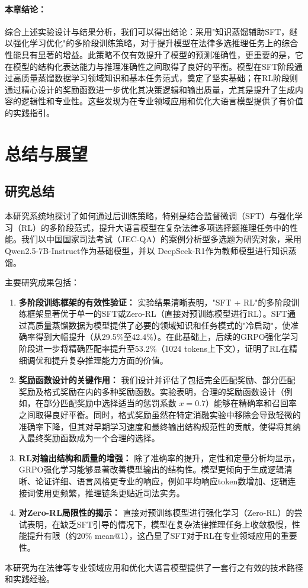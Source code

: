 \documentclass{article}
\newcommand{\qwen}{Qwen2.5-7B-Instruct}
\newcommand{\deepseekr}{DeepSeek-R1}
\newcommand{\qwen}{Qwen2.5-7B-Instruct}
\newcommand{\deepseekr}{DeepSeek-R1}
\begin{document}
\paragraph{本章结论：}
综合上述实验设计与结果分析，我们可以得出结论：采用"知识蒸馏辅助SFT，继以强化学习优化"的多阶段训练策略，对于提升模型在法律多选推理任务上的综合性能具有显著的增益。此策略不仅有效提升了模型的预测准确性，更重要的是，它在模型的结构化表达能力与推理准确性之间取得了良好的平衡。模型在SFT阶段通过高质量蒸馏数据学习领域知识和基本任务范式，奠定了坚实基础；在RL阶段则通过精心设计的奖励函数进一步优化其决策逻辑和输出质量，尤其是提升了生成内容的逻辑性和专业性。这些发现为在专业领域应用和优化大语言模型提供了有价值的实践指引。


\section{总结与展望}
\label{sec:conclusion_future_work}

\subsection{研究总结}
本研究系统地探讨了如何通过后训练策略，特别是结合监督微调（SFT）与强化学习（RL）的多阶段范式，提升大语言模型在复杂法律多项选择题推理任务中的性能。我们以中国国家司法考试（JEC-QA）的案例分析型多选题为研究对象，采用 \qwen 作为基础模型，并以 \deepseekr 作为教师模型进行知识蒸馏。

主要研究成果包括：
\begin{enumerate}
    \item \textbf{多阶段训练框架的有效性验证：} 实验结果清晰表明，"SFT + RL"的多阶段训练框架显著优于单一的SFT或Zero-RL（直接对预训练模型进行RL）。SFT通过高质量蒸馏数据为模型提供了必要的领域知识和任务模式的"冷启动"，使准确率得到大幅提升（从29.5\%至42.4\%）。在此基础上，后续的GRPO强化学习阶段进一步将精确匹配率提升至53.2\%（1024 tokens上下文），证明了RL在精细调优和提升复杂推理能力方面的价值。
    \item \textbf{奖励函数设计的关键作用：} 我们设计并评估了包括完全匹配奖励、部分匹配奖励及格式奖励在内的多种奖励函数。实验表明，合理的奖励函数设计（例如，在部分匹配奖励中选择适当的惩罚系数 $x=0.7$）能够在精确率和召回率之间取得良好平衡。同时，格式奖励虽然在特定消融实验中移除会导致轻微的准确率下降，但其对早期学习速度和最终输出结构规范性的贡献，使得将其纳入最终奖励函数成为一个合理的选择。
    \item \textbf{RL对输出结构和质量的增强：} 除了准确率的提升，定性和定量分析均显示，GRPO强化学习能够显著改善模型输出的结构性。模型更倾向于生成逻辑清晰、论证详细、语言风格更专业的响应，例如平均响应token数增加、逻辑连接词使用更频繁，推理链条更贴近司法实务。
    \item \textbf{对Zero-RL局限性的揭示：} 直接对预训练模型进行强化学习（Zero-RL）的尝试表明，在缺乏SFT引导的情况下，模型在复杂法律推理任务上收敛极慢，性能提升有限（约20\% mean@1），这凸显了SFT对于RL在专业领域应用的重要性。
\end{enumerate}
本研究为在法律等专业领域应用和优化大语言模型提供了一套行之有效的技术路径和实践经验。
\end{document}
